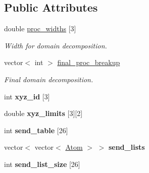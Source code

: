 \subsection*{Public Attributes}
\begin{DoxyCompactItemize}
\item 
\hypertarget{classsim__system_1_1System_afd08dee7d174a4dcdd4a82e91c1c065f}{double \hyperlink{classsim__system_1_1System_afd08dee7d174a4dcdd4a82e91c1c065f}{proc\-\_\-widths} \mbox{[}3\mbox{]}}\label{classsim__system_1_1System_afd08dee7d174a4dcdd4a82e91c1c065f}

\begin{DoxyCompactList}\small\item\em Width for domain decomposition. \end{DoxyCompactList}\item 
\hypertarget{classsim__system_1_1System_a541483991e6d8b8c78d1e4d36c321e7a}{vector$<$ int $>$ \hyperlink{classsim__system_1_1System_a541483991e6d8b8c78d1e4d36c321e7a}{final\-\_\-proc\-\_\-breakup}}\label{classsim__system_1_1System_a541483991e6d8b8c78d1e4d36c321e7a}

\begin{DoxyCompactList}\small\item\em Final domain decomposition. \end{DoxyCompactList}\item 
\hypertarget{classsim__system_1_1System_abc2dc9244a4f5ce800f192441abaeda0}{int {\bfseries xyz\-\_\-id} \mbox{[}3\mbox{]}}\label{classsim__system_1_1System_abc2dc9244a4f5ce800f192441abaeda0}

\item 
\hypertarget{classsim__system_1_1System_a43480194f4cd96b163371ea778eb1942}{double {\bfseries xyz\-\_\-limits} \mbox{[}3\mbox{]}\mbox{[}2\mbox{]}}\label{classsim__system_1_1System_a43480194f4cd96b163371ea778eb1942}

\item 
\hypertarget{classsim__system_1_1System_a5720800770ba838ac4ce6731d8ae869d}{int {\bfseries send\-\_\-table} \mbox{[}26\mbox{]}}\label{classsim__system_1_1System_a5720800770ba838ac4ce6731d8ae869d}

\item 
\hypertarget{classsim__system_1_1System_aec4348879e011acf1d0459ab9e318d1b}{vector$<$ vector$<$ \hyperlink{structatom_1_1Atom}{Atom} $>$ $>$ {\bfseries send\-\_\-lists}}\label{classsim__system_1_1System_aec4348879e011acf1d0459ab9e318d1b}

\item 
\hypertarget{classsim__system_1_1System_af3c9c1c9c8f624c289aaa59615f8b89a}{int {\bfseries send\-\_\-list\-\_\-size} \mbox{[}26\mbox{]}}\label{classsim__system_1_1System_af3c9c1c9c8f624c289aaa59615f8b89a}


\end{DoxyCompactItemize}
